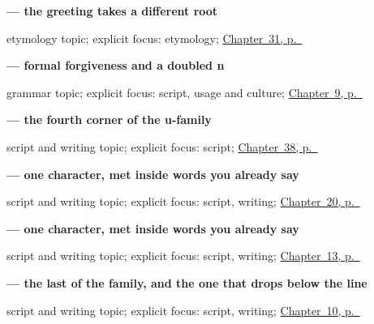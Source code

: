 \noindent\begin{minipage}[t]{\linewidth}
\raggedright
\textbf{ — the greeting takes a different root}\par
\footnotesize etymology topic; explicit focus: etymology; \hyperref[ch:ta-good-afternoon]{Chapter~31, p.~\pageref*{ch:ta-good-afternoon}}
\end{minipage}\par\smallskip

\noindent\begin{minipage}[t]{\linewidth}
\raggedright
\textbf{ — formal forgiveness and a doubled n}\par
\footnotesize grammar topic; explicit focus: script, usage and culture; \hyperref[ch:ta-sorry]{Chapter~9, p.~\pageref*{ch:ta-sorry}}
\end{minipage}\par\smallskip

\noindent\begin{minipage}[t]{\linewidth}
\raggedright
\textbf{ — the fourth corner of the u-family}\par
\footnotesize script and writing topic; explicit focus: script; \hyperref[ch:ta-keeping-well-and-leaving]{Chapter~38, p.~\pageref*{ch:ta-keeping-well-and-leaving}}
\end{minipage}\par\smallskip

\noindent\begin{minipage}[t]{\linewidth}
\raggedright
\textbf{ — one character, met inside words you already say}\par
\footnotesize script and writing topic; explicit focus: script, writing; \hyperref[ch:ta-numbers-and-weather]{Chapter~20, p.~\pageref*{ch:ta-numbers-and-weather}}
\end{minipage}\par\smallskip

\noindent\begin{minipage}[t]{\linewidth}
\raggedright
\textbf{ — one character, met inside words you already say}\par
\footnotesize script and writing topic; explicit focus: script, writing; \hyperref[ch:ta-body-parts]{Chapter~13, p.~\pageref*{ch:ta-body-parts}}
\end{minipage}\par\smallskip

\noindent\begin{minipage}[t]{\linewidth}
\raggedright
\textbf{ — the last of the family, and the one that drops below the line}\par
\footnotesize script and writing topic; explicit focus: script, writing; \hyperref[ch:ta-days-of-the-week]{Chapter~10, p.~\pageref*{ch:ta-days-of-the-week}}
\end{minipage}\par\smallskip

